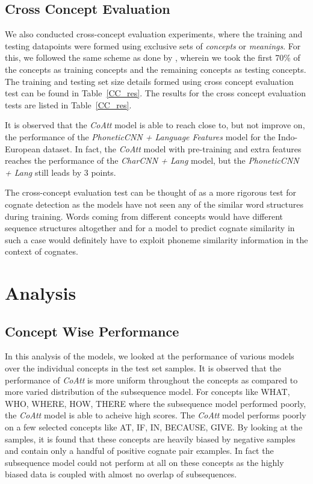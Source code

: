 \documentclass[11pt,letterpaper]{article}
\begin{document}
\subsection{Cross Concept Evaluation}

We also conducted cross-concept evaluation experiments, where the training and testing datapoints were formed using exclusive sets of \textit{concepts} or \textit{meanings}. For this, we followed the same scheme as done by \cite{rama2016siamese}, wherein we took the first 70\% of the concepts as training concepts and the remaining concepts as testing concepts. The training and testing set size details formed using cross concept evaluation test can be found in Table~\ref{CC_res}. The results for the cross concept evaluation tests are listed in Table~\ref{CC_res}.

It is observed that the \textit{CoAtt} model is able to reach close to, but not improve on, the performance of the \textit{PhoneticCNN + Language Features} model for the Indo-European dataset. In fact, the \textit{CoAtt} model with pre-training and extra features reaches the performance of the \textit{CharCNN + Lang} model, but the \textit{PhoneticCNN + Lang} still leads by 3 points.

The cross-concept evaluation test can be thought of as a more rigorous test for cognate detection as the models have not seen any of the similar word structures during training. Words coming from different concepts would have different sequence structures altogether and for a model to predict cognate similarity in such a case would definitely have to exploit phoneme similarity information in the context of cognates.

\section{Analysis}

\subsection{Concept Wise Performance}

In this analysis of the models, we looked at the performance of various models over the individual concepts in the test set samples. It is observed that the performance of \textit{CoAtt} is more uniform throughout the concepts as compared to more varied distribution of the subsequence model. For concepts like WHAT, WHO, WHERE, HOW, THERE where the subsequence model performed poorly, the \textit{CoAtt} model is able to acheive high scores. The \textit{CoAtt} model performs poorly on a few selected concepts like AT, IF, IN, BECAUSE, GIVE. By looking at the samples, it is found that these concepts are heavily biased by negative samples and contain only a handful of positive cognate pair examples. In fact the subsequence model could not perform at all on these concepts as the highly biased data is coupled with almost no overlap of subsequences.
\end{document}

